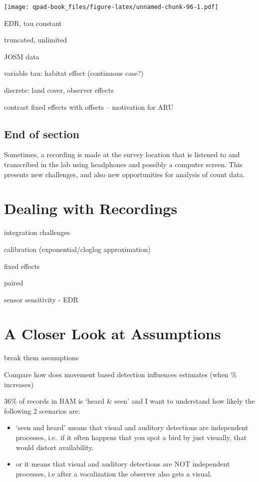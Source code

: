 \documentclass[12pt,]{book}
\providecommand{\tightlist}{%
  \setlength{\itemsep}{0pt}\setlength{\parskip}{0pt}}
\begin{document}
\texttt{[image: qpad-book\_files/figure-latex/unnamed-chunk-96-1.pdf]}

EDR, tau constant

truncated, unlimited

JOSM data

variable tau: habitat effect (continuous case?)

discrete: land cover, observer effects

contrast fixed effects with offsets -- motivation for ARU

\hypertarget{end-of-section}{%
\section{End of section}\label{end-of-section}}

Sometimes, a recording is made at the survey location
that is listened to and transcribed in the lab
using headphones and possibly a computer screen.
This presents new challenges, and also new opportunities
for analysis of count data.

\hypertarget{recordings}{%
\chapter{Dealing with Recordings}\label{recordings}}

integration challenges

calibration (exponential/cloglog approximation)

fixed effects

paired

sensor sensitivity - EDR

\hypertarget{assumptions}{%
\chapter{A Closer Look at Assumptions}\label{assumptions}}

break them assumptions

Compare how does movement based detection influences estimates (when \% increases)

36\% of records in BAM is `heard \& seen' and I want to understand how likely the following 2 scenarios are:

\begin{itemize}
\tightlist
\item
  `seen and heard' means that visual and auditory detections are independent processes, i.e.~if it often happens that you spot a bird by just visually, that would distort availability.
\item
  or it means that visual and auditory detections are NOT independent processes, i.e after a vocalization the observer also gets a visual.
\end{itemize}
\end{document}
